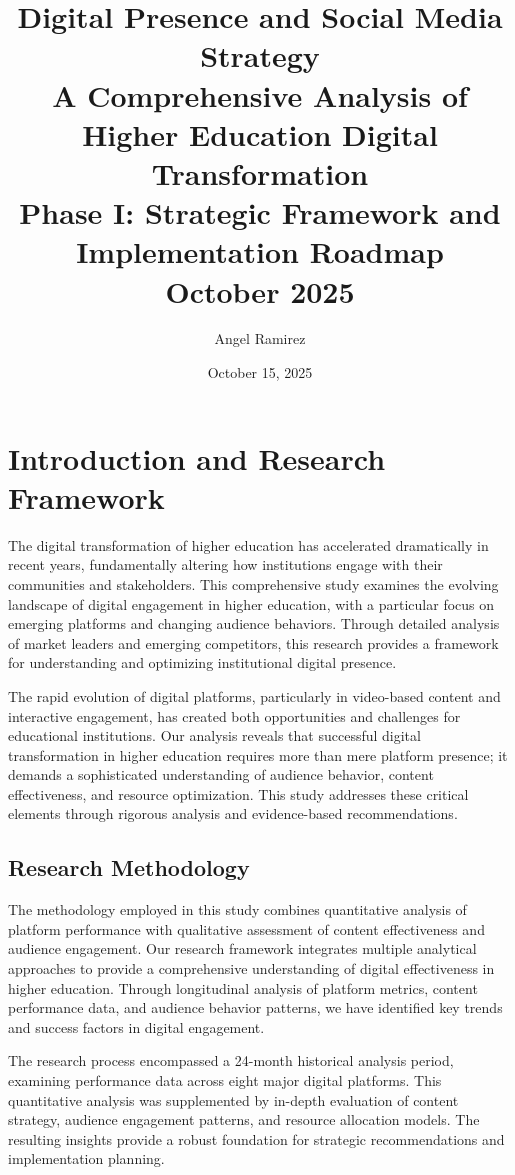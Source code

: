 \documentclass[12pt]{report}
\title{
    \Huge\textbf{Digital Presence and Social Media Strategy}\\[1cm]
    \Large\textbf{A Comprehensive Analysis of Higher Education Digital Transformation}\\[0.5cm]
    \large Phase I: Strategic Framework and Implementation Roadmap\\[1cm]
    \normalsize October 2025
}
\author{Angel Ramirez}
\date{October 15, 2025}
\begin{document}
\maketitle

\tableofcontents

\chapter{Introduction and Research Framework}

The digital transformation of higher education has accelerated dramatically in recent years, fundamentally altering how institutions engage with their communities and stakeholders. This comprehensive study examines the evolving landscape of digital engagement in higher education, with a particular focus on emerging platforms and changing audience behaviors. Through detailed analysis of market leaders and emerging competitors, this research provides a framework for understanding and optimizing institutional digital presence.

The rapid evolution of digital platforms, particularly in video-based content and interactive engagement, has created both opportunities and challenges for educational institutions. Our analysis reveals that successful digital transformation in higher education requires more than mere platform presence; it demands a sophisticated understanding of audience behavior, content effectiveness, and resource optimization. This study addresses these critical elements through rigorous analysis and evidence-based recommendations.

\section{Research Methodology}

The methodology employed in this study combines quantitative analysis of platform performance with qualitative assessment of content effectiveness and audience engagement. Our research framework integrates multiple analytical approaches to provide a comprehensive understanding of digital effectiveness in higher education. Through longitudinal analysis of platform metrics, content performance data, and audience behavior patterns, we have identified key trends and success factors in digital engagement.

The research process encompassed a 24-month historical analysis period, examining performance data across eight major digital platforms. This quantitative analysis was supplemented by in-depth evaluation of content strategy, audience engagement patterns, and resource allocation models. The resulting insights provide a robust foundation for strategic recommendations and implementation planning.
\end{document}
